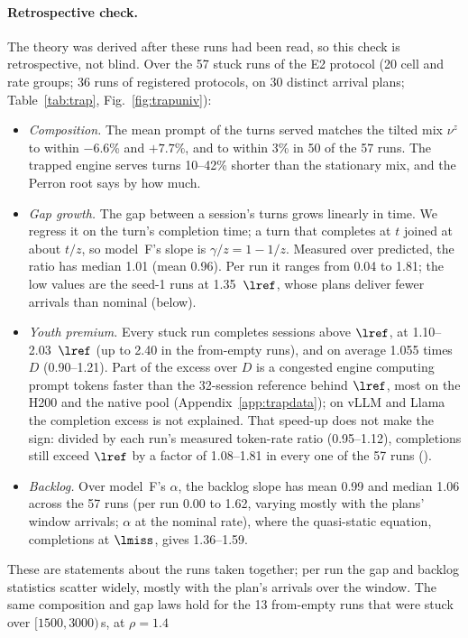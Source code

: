 \paragraph{Retrospective check.} The theory was derived after these runs had been read, so this check is retrospective, not
blind. Over the 57 stuck runs of the E2 protocol (20 cell and rate groups; 36 runs of registered protocols, on 30 distinct arrival
plans; Table~\ref{tab:trap}, Fig.~\ref{fig:trapuniv}):
\begin{itemize}[leftmargin=*,nosep]
\item \emph{Composition.} The mean prompt of the turns served matches the tilted mix $\nu^z$ to within $-6.6$\% and $+7.7$\%,
and to within 3\% in 50 of the 57 runs. The trapped engine serves turns 10--42\% shorter than the stationary mix, and the
Perron root says by how much.
\item \emph{Gap growth.} The gap between a session's turns grows linearly in time. We regress it on the turn's completion time;
a turn that completes at $t$ joined at about $t/z$, so model~F's slope is $\gamma/z=1-1/z$. Measured over predicted, the ratio has
median 1.01 (mean 0.96). Per run it ranges from 0.04 to 1.81; the low values are the seed-1 runs at 1.35~$\lref$, whose plans
deliver fewer arrivals than nominal (below).
\item \emph{Youth premium.} Every stuck run completes sessions above $\lref$, at 1.10--2.03~$\lref$ (up to 2.40 in the from-empty
runs), and on average 1.055 times $D$ (0.90--1.21). Part of the excess over $D$ is a congested engine computing prompt tokens
faster than the 32-session reference behind $\lref$, most on the H200 and the native pool (Appendix~\ref{app:trapdata}); on vLLM
and Llama the completion excess is not explained. That speed-up does not make the sign: divided by each run's measured
token-rate ratio (0.95--1.12), completions still exceed $\lref$ by a factor of 1.08--1.81 in every one of the 57 runs
().
\item \emph{Backlog.} Over model~F's $\alpha$, the backlog slope has mean 0.99 and median 1.06 across the 57 runs (per run 0.00
to 1.62, varying mostly with the plans' window arrivals; $\alpha$ at the nominal rate), where the quasi-static equation, completions at $\lmiss$, gives 1.36--1.59.
\end{itemize}
These are statements about the runs taken together; per run the gap and backlog statistics scatter widely, mostly with the plan's
arrivals over the window. The same composition and gap laws hold for the 13 from-empty runs that were stuck over $[1500,3000)$\,s, at $\rho=1.4$
